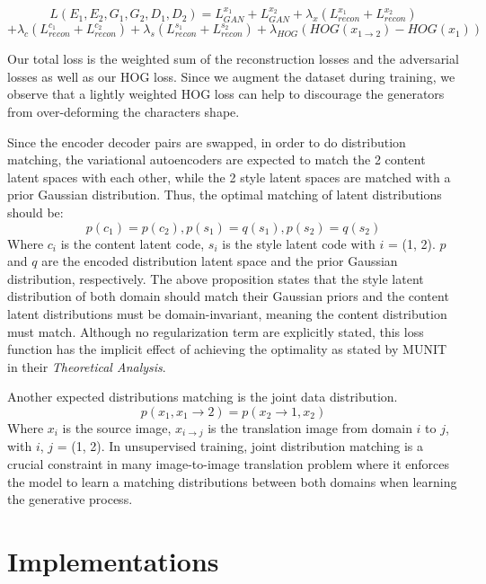 \documentclass[12pt]{report}
\begin{document}
\[L(E_1, E_2, G_1, G_2, D_1, D_2) = L^{x_1}_{GAN} + L^{x_2}_{GAN} + {\lambda}_x(L^{x_1}_{recon} + L^{x_2}_{recon}) \]
\[+ {\lambda}_c(L^{c_1}_{recon} + L^{c_2}_{recon}) + {\lambda}_s(L^{s_1}_{recon} + L^{s_2}_{recon}) + {\lambda}_{HOG}(HOG(x_{1\rightarrow 2}) - HOG(x_1))\]
 
Our total loss is the weighted sum of the reconstruction losses and the adversarial losses as well as our HOG loss. Since we augment the dataset during training, we observe that a lightly weighted HOG loss can help to discourage the generators from over-deforming the characters shape.

Since the encoder decoder pairs are swapped, in order to do distribution matching, the variational autoencoders are expected to match the 2 content latent spaces with each other, while the 2 style latent spaces are matched with a prior Gaussian distribution. Thus, the optimal matching of latent distributions should be:
\[p(c_1) = p(c_2), p(s_1) = q(s_1), p(s_2) = q(s_2)\]
Where $c_i$ is the content latent code, $s_i$ is the style latent code with $i$ = (1, 2). $p$ and $q$ are the encoded distribution latent space and the prior Gaussian distribution, respectively. The above proposition states that the style latent distribution of both domain should match their Gaussian priors and the content latent distributions must be domain-invariant, meaning the content distribution must match. Although no regularization term are explicitly stated, this loss function has the implicit effect of achieving the optimality as stated by MUNIT\cite{munit} in their \textit{Theoretical Analysis}.

Another expected distributions matching is the joint data distribution.
\[p(x_1, x_1\rightarrow2) = p(x_2\rightarrow1, x_2)\]
Where $x_i$ is the source image, $x_{i\rightarrow j}$ is the translation image from domain $i$ to $j$, with $i$, $j$ = (1, 2). In unsupervised training, joint distribution matching is a crucial constraint in many image-to-image translation problem where it enforces the model to learn a matching distributions between both domains when learning the generative process.

\section{Implementations}
\end{document}
